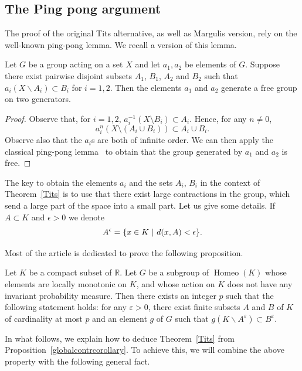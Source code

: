 \documentclass[AHL,Unicode,longabstracts,published]{cedram}
\DeclareMathOperator{\Homeo}{Homeo}
\newcommand{\R}{\mathbb{R}}
\newcommand{\ep}{\varepsilon}
\let\originalleft\left
\let\originalright\right
\renewcommand{\left}{\mathopen{}\mathclose\bgroup\originalleft}
\renewcommand{\right}{\aftergroup\egroup\originalright}
\newcommand{\R}{\mathbb{R}}
\begin{document}
\subsection{The Ping pong argument} The proof of the original Tits alternative, as well as Margulis version, rely on the well-known ping-pong lemma. We recall a version of this lemma.

\begin{lemm}
Let $G$ be a group acting on a set $X$ and let $a_1,a_2$ be elements of $G$. Suppose there exist pairwise disjoint subsets $A_1$, $B_1$, $A_2$ and $B_2$ such that $a_i(X\backslash A_i)\subset B_i$ for $i=1,2$. Then the elements $a_1$ and $a_2$ generate a free group on two generators.
\end{lemm}

\begin{proof}
Observe that, for $i=1,2$, $a_i^{-1}(X \setminus B_i) \subset A_i$. Hence, for any $n \neq 0$,
\[
a_i^{n}(X\setminus (A_{i} \cup B_{i})) \subset A_i \cup B_i.
\]
Observe also that the $a_i$s are both of infinite order. We can then apply the classical ping-pong lemma~\cite[p.~25]{dlH} to obtain that the group generated by $a_1$ and $a_2$ is free.
\end{proof}

The key to obtain the elements $a_i$ and the sets $A_i$, $B_i$ in the context of Theorem~\ref{Tits} is to use that there exist large contractions in the group, which send a large part of the space into a small part. Let us give some details. If $A\subset K$ and $\epsilon >0$ we denote
\[
A^{\epsilon}= \left\{ x \in K \ | \ d(x,A) < \epsilon \right\}.
\]

Most of the article is dedicated to prove the following proposition.

\begin{prop}\label{globalcontrcorollary}
Let $K$ be a compact subset of $\R$. Let $G$ be a subgroup of $\Homeo(K)$ whose elements are locally monotonic on $K$, and whose action on $K$ does not have any invariant probability measure. Then there exists an integer $p$ such that the following statement holds: for any $\ep>0$, there exist finite subsets $A$ and $B$ of $K$ of cardinality at most $p$ and an element $g$ of $G$ such that $g(K\backslash A^\ep)\subset B^\ep$.
\end{prop}

In what follows, we explain how to deduce Theorem~\ref{Tits} from Proposition~\ref{globalcontrcorollary}. To achieve this, we will combine the above property with the following general fact.
\end{document}
